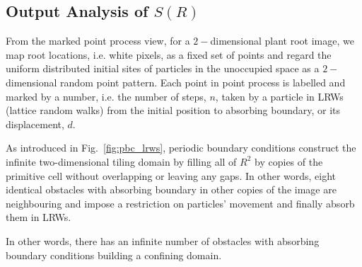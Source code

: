 

\subsection{Output Analysis of $S(R)$}


From the marked point process view, for a $2-$dimensional plant root
image, we map root locations, i.e. white pixels, as a fixed set of
points and regard the uniform distributed initial sites of particles
in the unoccupied space as a $2-$dimensional random point
pattern. Each point in point process is labelled and marked by a
number, i.e. the number of steps, $n$, taken by a particle in LRWs
(lattice random walks) from the initial position to absorbing
boundary, or its displacement, $d$. 

As introduced in Fig.~\ref{fig:pbc_lrws}, periodic boundary conditions
construct the infinite two-dimensional tiling domain by filling all of
$R^2$ by copies of the primitive cell without overlapping or leaving
any gaps. In other words, eight identical obstacles with absorbing
boundary in other copies of the image are neighbouring and impose a
restriction on particles' movement and finally absorb them in LRWs.


In other words, there has an infinite number of obstacles
with absorbing boundary conditions building a confining domain.
          

